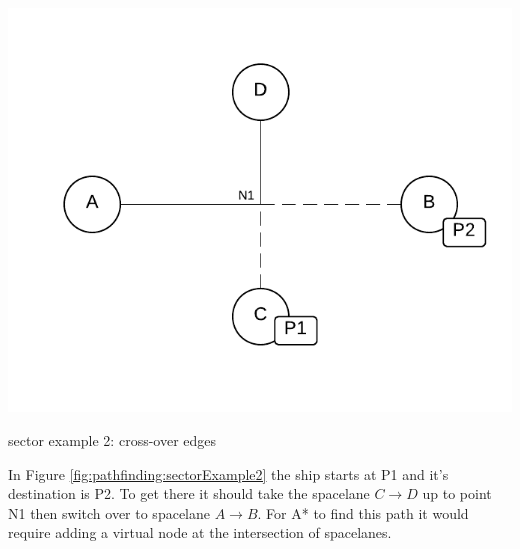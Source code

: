 \begin{marginfigure}
	\includegraphics{res/pathfinding/PathFindingSector2.pdf}
    \caption{sector example 2: cross-over edges}
	\label{fig:pathfinding:sectorExample2}
\end{marginfigure}
In Figure \ref{fig:pathfinding:sectorExample2} the ship starts at P1 and it's destination is P2.
To get there it should take the spacelane $C \to D$ up to point N1 then switch over to spacelane $A \to B$.
For A* to find this path it would require adding a virtual node at the intersection of spacelanes.

